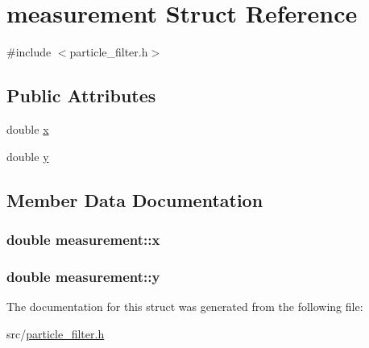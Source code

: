 \hypertarget{structmeasurement}{\section{measurement Struct Reference}
\label{structmeasurement}
}


{\ttfamily \#include $<$particle\-\_\-filter.\-h$>$}

\subsection*{Public Attributes}
\begin{DoxyCompactItemize}
\item 
double \hyperlink{structmeasurement_afdda3b07247bb0d386c6366f21dd999e}{x}
\item 
double \hyperlink{structmeasurement_a0b26378c2aa3858ae9c039a0ee27fe81}{y}
\end{DoxyCompactItemize}


\subsection{Member Data Documentation}
\hypertarget{structmeasurement_afdda3b07247bb0d386c6366f21dd999e}{
\subsubsection[{x}]{\setlength{\rightskip}{0pt plus 5cm}double measurement\-::x}}\label{structmeasurement_afdda3b07247bb0d386c6366f21dd999e}
\hypertarget{structmeasurement_a0b26378c2aa3858ae9c039a0ee27fe81}{
\subsubsection[{y}]{\setlength{\rightskip}{0pt plus 5cm}double measurement\-::y}}\label{structmeasurement_a0b26378c2aa3858ae9c039a0ee27fe81}


The documentation for this struct was generated from the following file\-:\begin{DoxyCompactItemize}
\item 
src/\hyperlink{particle__filter_8h}{particle\-\_\-filter.\-h}\end{DoxyCompactItemize}

